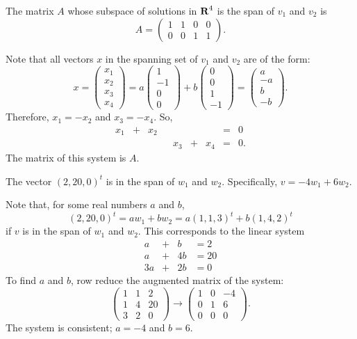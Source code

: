 \documentclass{ximera}
\begin{document}
\ans The matrix $A$ whose subspace of solutions in $\mbox{$\bf{R}$}^4$ is the span of
$v_1$ and $v_2$ is
\[
A = \left(\begin{array}{rrrr} 1 & 1 & 0 & 0 \\ 0 & 0 & 1 & 1
\end{array}\right).
\]

\soln Note that all vectors $x$ in the spanning set of $v_1$ and $v_2$
are of the form:
\[
x = \left(\begin{array}{r} x_1 \\ x_2 \\ x_3 \\ x_4
\end{array}\right)
= a\left(\begin{array}{r} 1 \\ -1 \\ 0 \\ 0 \end{array}\right) + 
b\left(\begin{array}{r} 0 \\ 0 \\ 1 \\ -1 \end{array}\right) =
\left(\begin{array}{r} a \\ -a \\ b \\ -b \end{array}\right).
\]
Therefore, $x_1 = -x_2$ and $x_3 = -x_4$.  So,
\[
\begin{array}{rrrrrrrrl}
x_1 & + & x_2 & & & & & = & 0 \\
& & & & x_3 & + & x_4 & = & 0. \end{array}
\]
The matrix of this system is $A$.

\ans The vector $(2,20,0)^t$ is in the span of $w_1$ and $w_2$. 
Specifically, $v = -4w_1 + 6w_2$.

\soln Note that, for some real numbers $a$ and $b$,
\[
(2,20,0)^t = aw_1 + bw_2 = a(1,1,3)^t + b(1,4,2)^t
\]
if $v$ is in the span of $w_1$ and $w_2$.
This corresponds to the linear system
\[
\begin{array}{rrrrr}
a & + & b & = 2 \\
a & + & 4b & = 20 \\
3a & + & 2b & = 0 \end{array}
\]
To find $a$ and $b$, row reduce the augmented matrix of the system:
\[
\left(\begin{array}{rr|r} 1 & 1 & 2 \\ 1 & 4 & 20 \\
3 & 2 & 0 \end{array}\right) \longrightarrow
\left(\begin{array}{rr|r} 1 & 0 & -4 \\ 0 & 1 & 6 \\
0 & 0 & 0 \end{array}\right).
\]
The system is consistent; $a = -4$ and $b = 6$.
\end{document}
